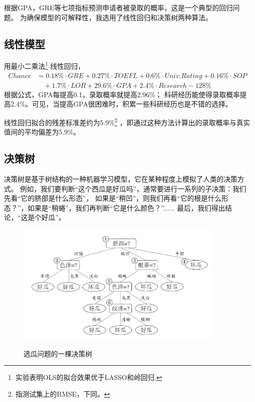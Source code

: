 \documentclass[12pt, UTF8, a4paper]{ctexart}
\begin{document}
根据GPA，GRE等七项指标预测申请者被录取的概率，这是一个典型的回归问题。
为确保模型的可解释性，我选用了线性回归和决策树两种算法。

\subsection{线性模型}

用最小二乘法\footnote{实验表明OLS的拟合效果优于LASSO和岭回归.}
线性回归，
\begin{equation}\label{eq:1}
\begin{aligned}    
Chance &= 0.18\%\cdot GRE + 0.27\%\cdot TOEFL + 
        0.6\%\cdot Univ.Rating + 0.16\%\cdot SOP \\
       &\quad + 1.7\%\cdot LOR + 29.6\%\cdot GPA + 2.4\%\cdot Research - 128\%
\end{aligned}
\end{equation}根据公式，GPA每提高0.1，录取概率就提高2.96\%；
科研经历能使得录取概率提高2.4\%。可见，当提高GPA很困难时，积累一些科研经历也是不错的选择。

线性回归拟合的残差标准差约为5.9\%\footnote{指测试集上的RMSE，下同。}
，即通过这种方法计算出的录取概率与真实值间的平均偏差为5.9\%。

\subsection{决策树}\label{sec3.2}

决策树是基于树结构的一种机器学习模型，它在某种程度上模拟了人类的决策方式。
例如，我们要判断“这个西瓜是好瓜吗”，通常要进行一系列的子决策：我们先看“它的脐部是什么形态”，
如果是“稍凹”，则我们再看“它的根是什么形态？”，如果是“稍蜷”，我们再判断“它是什么颜色？”......
最后，我们得出结论，“这是个好瓜”。

\begin{figure}[htb]
    \centering
    \includegraphics[width=4in, keepaspectratio]{./pic/decisionTreeDemo.png}\\
    \caption{选瓜问题的一棵决策树}
\end{figure}
\end{document}
